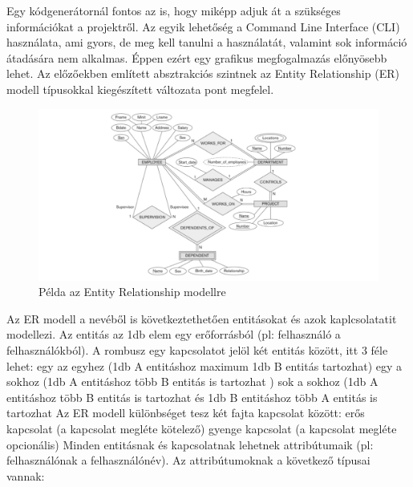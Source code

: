 \documentclass[a4paper,12pt,oneside]{report}
\begin{document}
\begin{justify}

	Egy kódgenerátornál fontos az is, hogy miképp adjuk át a szükséges információkat a projektről. Az egyik lehetőség a Command Line Interface (CLI) használata, ami gyors, de meg kell tanulni a használatát, valamint sok információ átadására nem alkalmas. Éppen ezért egy grafikus megfogalmazás előnyösebb lehet. Az előzőekben említett absztrakciós szintnek az Entity Relationship (ER) modell típusokkal kiegészített változata pont megfelel.

	\begin{figure}[h]
		\includegraphics[width=\textwidth]{contents/images/ermodell_example.png}
		\caption{Példa az Entity Relationship modellre \cite{website:example_of_er} }
		\label{fig:ermodell_example}
	\end{figure}

	Az ER modell a nevéből is következtethetően entitásokat és azok kaplcsolatatit modellezi. Az entitás az 1db elem egy erőforrásból (pl: felhasználó a felhasználókból). A rombusz egy kapcsolatot jelöl két entitás között, itt 3 féle lehet:
	egy az egyhez (1db A entitáshoz maximum 1db B entitás tartozhat)
	egy a sokhoz (1db A entitáshoz több B entitás is tartozhat )
	sok a sokhoz (1db A entitáshoz több B entitás is tartozhat és 1db B entitáshoz több A entitás is tartozhat
	Az ER modell különbséget tesz két fajta kapcsolat között:
	erős kapcsolat (a kapcsolat megléte kötelező)
	gyenge kapcsolat (a kapcsolat megléte opcionális)
	Minden entitásnak és kapcsolatnak lehetnek attribútumaik (pl: felhasználónak a felhasználónév). Az attribútumoknak a következő típusai vannak: 


\end{justify}
\end{document}
